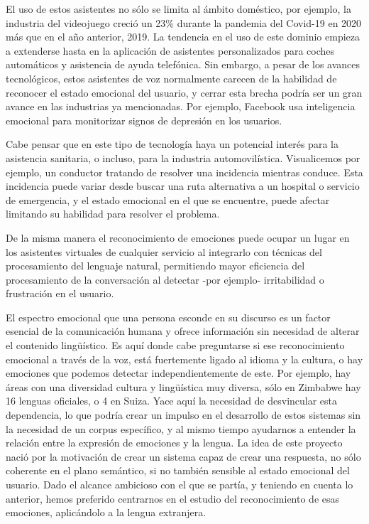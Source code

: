 \documentclass[11pt,a4paper,spanish]{book}
\begin{document}
	El uso de estos asistentes no sólo se limita al ámbito doméstico, por ejemplo, la industria del videojuego creció un 23\% durante la pandemia del Covid-19 en 2020 más que en el año anterior, 2019. La tendencia en el uso de este dominio empieza a extenderse hasta en la aplicación de asistentes personalizados para coches automáticos y asistencia de ayuda telefónica. 
	Sin embargo, a pesar de los avances tecnológicos, estos asistentes de voz normalmente carecen de la habilidad de reconocer el estado emocional del usuario, y cerrar esta brecha podría ser un gran avance en las industrias ya mencionadas. Por ejemplo, Facebook usa inteligencia emocional para monitorizar signos de depresión en los usuarios.
	
	Cabe pensar que en este tipo de tecnología haya un potencial interés para la asistencia sanitaria, o incluso, para la industria automovilística. Visualicemos por ejemplo, un conductor tratando de resolver una incidencia mientras conduce. Esta incidencia puede variar desde buscar una ruta alternativa a un hospital o servicio de emergencia, y el estado emocional en el que se encuentre, puede afectar limitando su habilidad para resolver el problema. 
	
	De la misma manera el reconocimiento de emociones puede ocupar un lugar en los asistentes virtuales de cualquier servicio al integrarlo con técnicas del procesamiento del lenguaje natural, permitiendo mayor eficiencia del procesamiento de la conversación al detectar -por ejemplo-  irritabilidad o frustración en el usuario. 
	
	El espectro emocional que una persona esconde en su discurso es un factor esencial de la comunicación humana y ofrece información sin necesidad de alterar el contenido lingüístico. Es aquí donde cabe preguntarse si ese reconocimiento emocional a través de la voz, está fuertemente ligado al idioma y la cultura, o hay emociones que podemos detectar independientemente de este. Por ejemplo, hay áreas con una diversidad cultura y lingüística muy diversa, sólo en Zimbabwe hay 16 lenguas oficiales, o 4 en Suiza. Yace aquí la necesidad de desvincular esta dependencia, lo que podría crear un impulso en el desarrollo de estos sistemas sin la necesidad de un corpus específico, y al mismo tiempo ayudarnos a entender la relación entre la expresión de emociones y la lengua.
	La idea de este proyecto nació por la motivación de crear un sistema capaz de crear una respuesta, no sólo coherente en el plano semántico, si no también sensible al estado emocional del usuario. Dado el alcance ambicioso con el que se partía, y teniendo en cuenta lo anterior, hemos preferido centrarnos en el estudio del reconocimiento de esas emociones, aplicándolo a la lengua extranjera.
 
\end{document}
